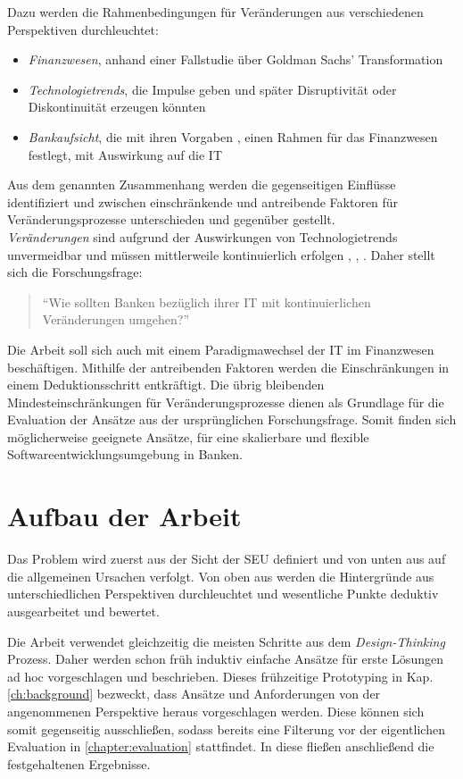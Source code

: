 Dazu werden die Rahmenbedingungen für Veränderungen aus verschiedenen Perspektiven durchleuchtet:
\begin{itemize}
    \item \emph{Finanzwesen}, anhand einer Fallstudie \cite{Gupta:2017} über Goldman Sachs' Transformation
    \item \emph{Technologietrends}, die Impulse geben und später Disruptivität oder Diskontinuität erzeugen könnten
    \item \emph{Bankaufsicht}, die mit ihren Vorgaben \cite{MaRisk:2017}, \cite{BAIT:2018} einen Rahmen für das Finanzwesen festlegt, mit Auswirkung auf die IT
\end{itemize}
 
Aus dem genannten Zusammenhang werden die gegenseitigen Einflüsse identifiziert und zwischen einschränkende und antreibende Faktoren für Veränderungsprozesse unterschieden und gegenüber gestellt. 
\medskip
\\
\emph{Veränderungen} sind aufgrund der Auswirkungen von Technologietrends unvermeidbar und müssen mittlerweile kontinuierlich erfolgen \cite{Bussmann2006}, \cite{Alt2017}, \cite{Fernandez:2020}. Daher stellt sich die Forschungsfrage: 
\begin{quote}
    \enquote{Wie sollten Banken bezüglich ihrer IT mit kontinuierlichen Veränderungen umgehen?}
\end{quote}

Die Arbeit soll sich auch mit einem Paradigmawechsel der IT im Finanzwesen beschäftigen. Mithilfe der antreibenden Faktoren werden die Einschränkungen in einem Deduktionsschritt entkräftigt. Die übrig bleibenden Mindesteinschränkungen für Veränderungsprozesse dienen als Grundlage für die Evaluation der Ansätze aus der ursprünglichen Forschungsfrage. Somit finden sich möglicherweise geeignete Ansätze, für eine skalierbare und flexible Softwareentwicklungsumgebung in Banken.


%
%
\section{Aufbau der Arbeit}
\label{sec:intro:structure}
Das Problem wird zuerst aus der Sicht der \ac{SEU} definiert und von unten aus auf die allgemeinen Ursachen verfolgt. Von oben aus werden die Hintergründe aus unterschiedlichen Perspektiven durchleuchtet und wesentliche Punkte deduktiv ausgearbeitet und bewertet.

Die Arbeit verwendet gleichzeitig die meisten Schritte aus dem \emph{Design-Thinking} Prozess. Daher werden schon früh induktiv einfache Ansätze für erste Lösungen ad hoc vorgeschlagen und beschrieben. Dieses frühzeitige Prototyping in Kap. \ref{ch:background} bezweckt, dass Ansätze und Anforderungen von der angenommenen Perspektive heraus vorgeschlagen werden. Diese können sich somit gegenseitig ausschließen, sodass bereits eine Filterung vor der eigentlichen Evaluation in \ref{chapter:evaluation} stattfindet. In diese fließen anschließend die festgehaltenen Ergebnisse.

